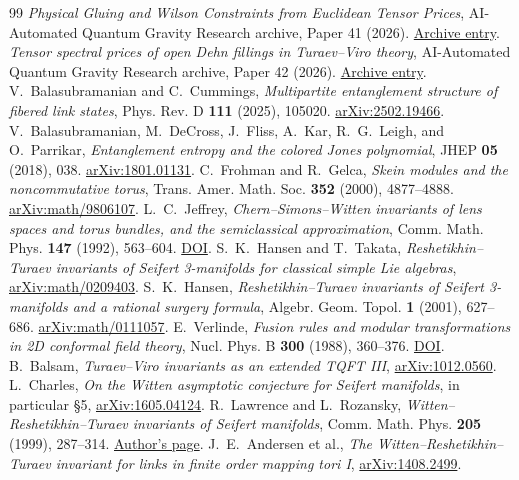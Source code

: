 \documentclass[11pt]{article}
\begin{document}
\clearpage
\begin{thebibliography}{99}
 \emph{Physical Gluing and Wilson Constraints from Euclidean Tensor Prices}, AI-Automated Quantum Gravity Research archive, Paper 41 (2026). \href{https://github.com/g3173028019-beep/ai-automated-quantum-gravity-research/tree/main/papers/41-tensor-prices-tv-fusion-and-wilson}{Archive entry}.
 \emph{Tensor spectral prices of open Dehn fillings in Turaev--Viro theory}, AI-Automated Quantum Gravity Research archive, Paper 42 (2026). \href{https://github.com/g3173028019-beep/ai-automated-quantum-gravity-research/tree/main/papers/42-tensor-prices-tv-dehn-filling}{Archive entry}.
 V.\ Balasubramanian and C.\ Cummings, \emph{Multipartite entanglement structure of fibered link states}, Phys. Rev. D \textbf{111} (2025), 105020. \href{https://arxiv.org/abs/2502.19466}{arXiv:2502.19466}.
 V.\ Balasubramanian, M.\ DeCross, J.\ Fliss, A.\ Kar, R.\ G.\ Leigh, and O.\ Parrikar, \emph{Entanglement entropy and the colored Jones polynomial}, JHEP \textbf{05} (2018), 038. \href{https://arxiv.org/abs/1801.01131}{arXiv:1801.01131}.
 C.\ Frohman and R.\ Gelca, \emph{Skein modules and the noncommutative torus}, Trans. Amer. Math. Soc. \textbf{352} (2000), 4877--4888. \href{https://arxiv.org/abs/math/9806107}{arXiv:math/9806107}.
 L.\ C.\ Jeffrey, \emph{Chern--Simons--Witten invariants of lens spaces and torus bundles, and the semiclassical approximation}, Comm. Math. Phys. \textbf{147} (1992), 563--604. \href{https://doi.org/10.1007/BF02097243}{DOI}.
 S.\ K.\ Hansen and T.\ Takata, \emph{Reshetikhin--Turaev invariants of Seifert 3-manifolds for classical simple Lie algebras}, \href{https://arxiv.org/abs/math/0209403}{arXiv:math/0209403}.
 S.\ K.\ Hansen, \emph{Reshetikhin--Turaev invariants of Seifert 3-manifolds and a rational surgery formula}, Algebr. Geom. Topol. \textbf{1} (2001), 627--686. \href{https://arxiv.org/abs/math/0111057}{arXiv:math/0111057}.
 E.\ Verlinde, \emph{Fusion rules and modular transformations in 2D conformal field theory}, Nucl. Phys. B \textbf{300} (1988), 360--376. \href{https://doi.org/10.1016/0550-3213(88)90103-7}{DOI}.
 B.\ Balsam, \emph{Turaev--Viro invariants as an extended TQFT III}, \href{https://arxiv.org/abs/1012.0560}{arXiv:1012.0560}.
 L.\ Charles, \emph{On the Witten asymptotic conjecture for Seifert manifolds}, in particular \S5, \href{https://arxiv.org/abs/1605.04124}{arXiv:1605.04124}.
 R.\ Lawrence and L.\ Rozansky, \emph{Witten--Reshetikhin--Turaev invariants of Seifert manifolds}, Comm. Math. Phys. \textbf{205} (1999), 287--314. \href{https://www.ma.huji.ac.il/~ruthel/papers/99wrtsm.html}{Author's page}.
 J.\ E.\ Andersen et al., \emph{The Witten--Reshetikhin--Turaev invariant for links in finite order mapping tori I}, \href{https://arxiv.org/abs/1408.2499}{arXiv:1408.2499}.
\end{thebibliography}
\end{document}
